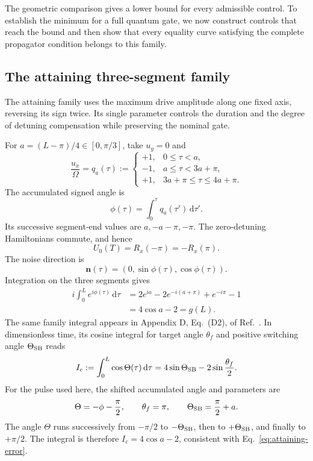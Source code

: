\documentclass[12pt]{iopjournal}
\newcommand{\dd}{\mathrm{d}}
\newcommand{\nvec}{\mathbf n}
\begin{document}
The geometric comparison gives a lower bound for every admissible
control. To establish the minimum for a full quantum gate, we now
construct controls that reach the bound and then show that every
equality curve satisfying the complete propagator condition belongs
to this family.

\FloatBarrier
\subsection{The attaining three-segment family}

The attaining family uses the maximum drive amplitude along one fixed
axis, reversing its sign twice. Its single parameter controls the
duration and the degree of detuning compensation while preserving
the nominal gate.

For $a=(L-\pi)/4\in[0,\pi/3]$, take $u_y=0$ and
\begin{equation}
 \frac{u_x}{\Omega}=q_a(\tau):=
 \begin{cases}
 +1,&0\le\tau<a,\\
 -1,&a\le\tau<3a+\pi,\\
 +1,&3a+\pi\le\tau\le4a+\pi.
 \end{cases}
 \label{eq:attaining-pulse}
\end{equation}
The accumulated signed angle is
\begin{equation*}
 \phi(\tau)=\int_0^\tau q_a(\tau')\,\dd\tau'.
\end{equation*}
Its successive segment-end values are $a,-a-\pi,-\pi$.
The zero-detuning Hamiltonians commute, and hence
\begin{equation}
 U_0(T)=R_x(-\pi)=-R_x(\pi).
 \label{eq:attaining-gate}
\end{equation}
The noise direction is
\begin{equation}
 \nvec(\tau)=(0,\sin\phi(\tau),\cos\phi(\tau)).
 \label{eq:attaining-tangent}
\end{equation}
Integration on the three segments gives
\begin{align}
 i\int_0^L e^{i\phi(\tau)}\,\dd\tau
 &=2e^{ia}-2e^{-i(a+\pi)}+e^{-i\pi}-1\nonumber\\
 &=4\cos a-2=g(L).
 \label{eq:attaining-error}
\end{align}
The same family integral appears in Appendix D, Eq.~(D2), of
Ref.~\cite{kukita2024}. In dimensionless time, its cosine integral
for target angle $\theta_f$ and positive switching angle
$\Theta_{\rm SB}$ reads
\begin{equation*}
 I_c:=\int_0^L\cos\Theta(\tau)\,\dd\tau
 =4\sin\Theta_{\rm SB}-2\sin\frac{\theta_f}{2}.
\end{equation*}
For the pulse used here, the shifted accumulated angle and parameters
are
\begin{equation*}
 \Theta=-\phi-\frac\pi2,\qquad
 \theta_f=\pi,\qquad \Theta_{\rm SB}=\frac\pi2+a.
\end{equation*}
The angle $\Theta$ runs successively from $-\pi/2$ to
$-\Theta_{\rm SB}$, then to $+\Theta_{\rm SB}$, and finally to
$+\pi/2$. The integral is therefore $I_c=4\cos a-2$, consistent
with Eq.~\eqref{eq:attaining-error}.
\end{document}
